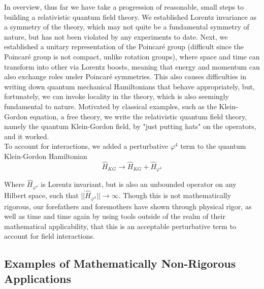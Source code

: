 \noindent In overview, thus far we have take a progression of reasonable, small steps to building a relativistic quantum field theory. We established Lorentz invariance as a symmetry of the theory, which may not quite be a fundamental symmetry of nature, but has not been violated by any experiments to date. Next, we established a unitary representation of the Poincar\'e group (difficult since the Poincar\'e group is not compact, unlike rotation groups), where space and time can transform into other via Lorentz boosts, meaning that energy and momentum can also exchange roles under Poincar\'e symmetries. This also causes difficulties in writing down quantum mechanical Hamiltonians that behave appropriately, but, fortunately, we can invoke locality in the theory, which is also seemingly fundamental to nature. Motivated by classical examples, such as the Klein-Gordon equation, a free theory, we write the relativistic quantum field theory, namely the quantum Klein-Gordon field, by "just putting hats" on the operators, and it worked. \\

\noindent To account for interactions, we added a perturbative $\varphi^4$ term to the quantum Klein-Gordon Hamiltonian
\begin{equation}
\hat{H}_{KG} \to \hat{H}_{KG} + \hat{H}_{\varphi^4}
\end{equation}

\noindent Where $\hat{H}_{\varphi^4}$ is Lorentz invariant, but is also an unbounded operator on any Hilbert space, such that $||\hat{H}_{\varphi^4} || \to \infty$. Though this is not mathematically rigorous, our forefathers and foremothers have shown through physical rigor, as well as time and time again by using tools outside of the realm of their mathematical applicability, that this is an acceptable perturbative term to account for field interactions. \\

\subsection*{Examples of Mathematically Non-Rigorous Applications}

